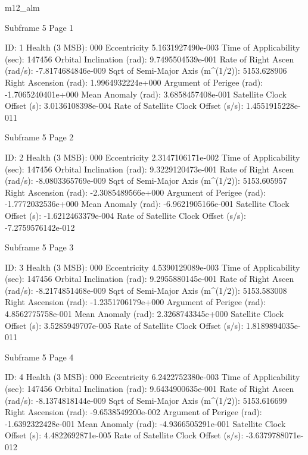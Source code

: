 m12_alm


 Subframe  5 Page  1

 ID:				      1
 Health (3 MSB):		     000
 Eccentricity			     5.1631927490e-003
 Time of Applicability (sec):	       147456
 Orbital Inclination (rad):	     9.7495504539e-001
 Rate of Right Ascen (rad/s):	     -7.8174684846e-009
 Sqrt of Semi-Major Axis (m^(1/2)):  5153.628906
 Right Ascension (rad): 	     1.9964932224e+000
 Argument of Perigee (rad):	     -1.7065240401e+000
 Mean Anomaly (rad):		     3.6858457408e-001
 Satellite Clock Offset (s):	     3.0136108398e-004
 Rate of Satellite Clock Offset (s/s): 1.4551915228e-011

 Subframe  5 Page  2

 ID:				      2
 Health (3 MSB):		     000
 Eccentricity			     2.3147106171e-002
 Time of Applicability (sec):	       147456
 Orbital Inclination (rad):	     9.3229120473e-001
 Rate of Right Ascen (rad/s):	     -8.0803365769e-009
 Sqrt of Semi-Major Axis (m^(1/2)):  5153.605957
 Right Ascension (rad): 	     -2.3085489566e+000
 Argument of Perigee (rad):	     -1.7772032536e+000
 Mean Anomaly (rad):		     -6.9621905166e-001
 Satellite Clock Offset (s):	     -1.6212463379e-004
 Rate of Satellite Clock Offset (s/s): -7.2759576142e-012

 Subframe  5 Page  3

 ID:				      3
 Health (3 MSB):		     000
 Eccentricity			     4.5390129089e-003
 Time of Applicability (sec):	       147456
 Orbital Inclination (rad):	     9.2955880145e-001
 Rate of Right Ascen (rad/s):	     -8.2174851468e-009
 Sqrt of Semi-Major Axis (m^(1/2)):  5153.583008
 Right Ascension (rad): 	     -1.2351706179e+000
 Argument of Perigee (rad):	     4.8562775758e-001
 Mean Anomaly (rad):		     2.3268743345e+000
 Satellite Clock Offset (s):	     3.5285949707e-005
 Rate of Satellite Clock Offset (s/s): 1.8189894035e-011

 Subframe  5 Page  4

 ID:				      4
 Health (3 MSB):		     000
 Eccentricity			     6.2422752380e-003
 Time of Applicability (sec):	       147456
 Orbital Inclination (rad):	     9.6434900635e-001
 Rate of Right Ascen (rad/s):	     -8.1374818144e-009
 Sqrt of Semi-Major Axis (m^(1/2)):  5153.616699
 Right Ascension (rad): 	     -9.6538549200e-002
 Argument of Perigee (rad):	     -1.6392322428e-001
 Mean Anomaly (rad):		     -4.9366505291e-001
 Satellite Clock Offset (s):	     4.4822692871e-005
 Rate of Satellite Clock Offset (s/s): -3.6379788071e-012

